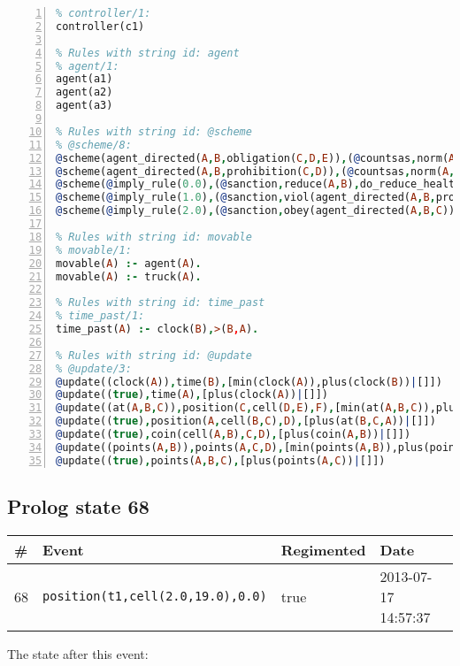 \documentclass[11pt]{article}\usepackage[utf8]{inputenc}\usepackage{geometry}
\begin{document}
\begin{lstlisting}[language=Prolog, numbers=left]
% Rules with string id: controller
% controller/1:
controller(c1)

% Rules with string id: agent
% agent/1:
agent(a1)
agent(a2)
agent(a3)

% Rules with string id: @scheme
% @scheme/8:
@scheme(agent_directed(A,B,obligation(C,D,E)),(@countsas,norm(A,B,F,obligation(C,D,E)),F),false,(listTrue(C)),(time_past(D)),false,[plus(viol(agent_directed(A,B,obligation(C,D,E))))|[]],[plus(obey(agent_directed(A,B,obligation(C,D,E))))|[]])
@scheme(agent_directed(A,B,prohibition(C,D)),(@countsas,norm(A,B,E,prohibition(C,D)),E),(listTrue(C)),false,(false),false,[plus(viol(agent_directed(A,B,prohibition(C,D))))|[]],[plus(obey(agent_directed(A,B,prohibition(C,D))))|[]])
@scheme(@imply_rule(0.0),(@sanction,reduce(A,B),do_reduce_health(A,B),notifyAgent(A,changed(status))),true,false,false,false,[min(reduce(A,B))|[]],[])
@scheme(@imply_rule(1.0),(@sanction,viol(agent_directed(A,B,prohibition(C,D))),do_sanction(D)),true,false,false,false,[min(viol(agent_directed(A,B,prohibition(C,D))))|[]],[])
@scheme(@imply_rule(2.0),(@sanction,obey(agent_directed(A,B,C))),true,false,false,false,[min(obey(agent_directed(A,B,C)))|[]],[])

% Rules with string id: movable
% movable/1:
movable(A) :- agent(A).
movable(A) :- truck(A).

% Rules with string id: time_past
% time_past/1:
time_past(A) :- clock(B),>(B,A).

% Rules with string id: @update
% @update/3:
@update((clock(A)),time(B),[min(clock(A)),plus(clock(B))|[]])
@update((true),time(A),[plus(clock(A))|[]])
@update((at(A,B,C)),position(C,cell(D,E),F),[min(at(A,B,C)),plus(at(D,E,C))|[]])
@update((true),position(A,cell(B,C),D),[plus(at(B,C,A))|[]])
@update((true),coin(cell(A,B),C,D),[plus(coin(A,B))|[]])
@update((points(A,B)),points(A,C,D),[min(points(A,B)),plus(points(A,D))|[]])
@update((true),points(A,B,C),[plus(points(A,C))|[]])

\end{lstlisting}
\clearpage 
\subsection{Prolog state 68}
\begin{table}[ht]
\centering 
\begin{tabular}{l l l l} 
\textbf{\#} & \textbf{Event} & \textbf{Regimented} & \textbf{Date} \\ [0.5ex] 
\hline
68&\texttt{position(t1,cell(2.0,19.0),0.0)}&true&2013-07-17 14:57:37\\ [1ex] \hline\end{tabular}
\end{table}
The state after this event:
\end{document}
